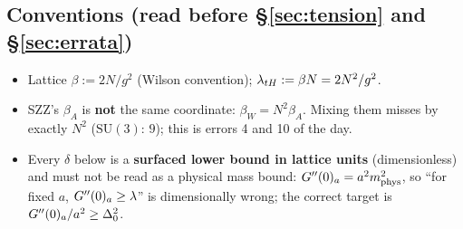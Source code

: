\subsection{Conventions (read before \S\ref{sec:tension} and \S\ref{sec:errata})}

\begin{itemize}
\item Lattice $\beta := 2N/g^{2}$ (Wilson convention); $\lambda_{tH} := \beta N = 2N^{2}/g^{2}$.
\item SZZ's $\beta_A$ is \textbf{not} the same coordinate: $\beta_W = N^{2}\beta_A$. Mixing them
      misses by exactly $N^{2}$ ($\mathrm{SU}(3)$: $9$); this is errors 4 and 10 of the day. \LT
\item Every $\delta$ below is a \textbf{surfaced lower bound in lattice units} (dimensionless) and
      must not be read as a physical mass bound: $G''(0)_a = a^{2}m_{\mathrm{phys}}^{2}$, so ``for
      fixed $a$, $G''(0)_a \ge \lambda$'' is dimensionally wrong; the correct target is
      $G''(0)_a/a^{2} \ge \Delta_0^{2}$. \LT
\end{itemize}
